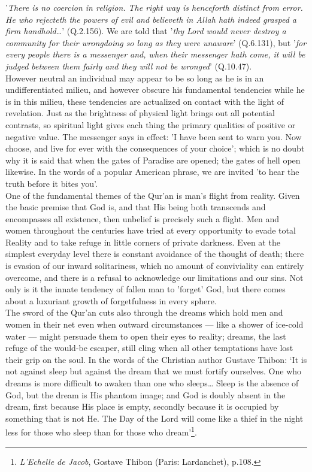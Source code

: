 \documentclass[10pt, twoside]{book}
\begin{document}
'\emph{There is no coercion in religion. The right way is henceforth distinct from error. He who rejecteth 
the powers of evil and believeth in Allah hath indeed grasped a firm handhold\ldots{}}' (Q.2.156). We are 
told that '\emph{thy Lord would never destroy a community for their wrongdoing so long as they were 
unaware}' (Q.6.131), but '\emph{for every people there is a messenger and, when their messenger hath come, it will be judged between them fairly and they will not be wronged}' (Q.10.47). \\

However neutral an individual may appear to be so long as he is in an undifferentiated milieu, and 
however obscure his fundamental tendencies while he is in this milieu, these tendencies are 
actualized on contact with the light of revelation. Just as the brightness of physical light brings 
out all potential contrasts, so spiritual light gives each thing the primary qualities of positive or 
negative value. The messenger says in effect: 'I have been sent to warn you. Now choose, and live for 
ever with the consequences of your choice'; which is no doubt why it is said that when the gates of 
Paradise are opened; the gates of hell open likewise. In the words of a popular American phrase, we 
are invited 'to hear the truth before it bites you'. \\

One of the fundamental themes of the Qur'an is man's flight from reality. Given the basic premise 
that God is, and that His being both transcends and encompasses all existence, then unbelief is 
precisely such a flight. Men and women throughout the centuries have tried at every opportunity to 
evade total Reality and to take refuge in little corners of private darkness. Even at the simplest 
everyday level there is constant avoidance of the thought of death; there is evasion of our inward 
solitariness, which no amount of conviviality can entirely overcome, and there is a refusal to 
acknowledge our limitations and our sins. Not only is it the innate tendency of fallen man to 
'forget' God, but there comes about a luxuriant growth of forgetfulness in every sphere. \\

The sword of the Qur'an cuts also through the dreams which hold men and women in their net even when 
outward circumstances --- like a shower of ice-cold water --- might persuade them to open their eyes to 
reality; dreams, the last refuge of the would\hyp{}be escaper, still cling when all other temptations have 
lost their grip on the soul. In the words of the Christian author Gustave Thibon: `It is not against 
sleep but against the dream that we must fortify ourselves. One who dreams is more difficult to 
awaken than one who sleeps\ldots{} Sleep is the absence of God, but the dream is His phantom image; and God is doubly absent in the dream, first because His place is empty, secondly because it is occupied 
by something that is not He. The Day of the Lord will come like a thief in the night less for those 
who sleep than for those who dream'\footnote{\emph{L'Echelle de Jacob}, Gostave Thibon (Paris: Lardanchet), p.108.}.\\
\end{document}
